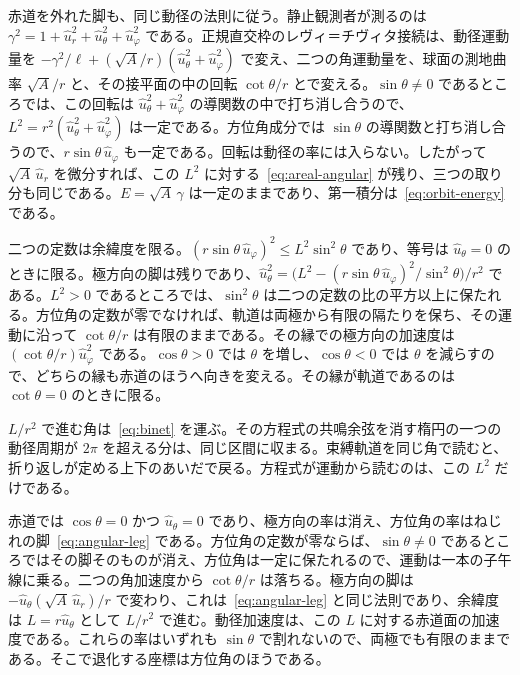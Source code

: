 \documentclass[a4paper]{article}
\begin{document}
赤道を外れた脚も、同じ動径の法則に従う。静止観測者が測るのは \(\gamma^{2}=1+\hat{u}_{r}^{2}+\hat{u}_{\theta}^{2}+\hat{u}_{\varphi}^{2}\) である。正規直交枠のレヴィ＝チヴィタ接続は、動径運動量を \(-\gamma^{2}/\ell+(\sqrt{A}/r)(\hat{u}_{\theta}^{2}+\hat{u}_{\varphi}^{2})\) で変え、二つの角運動量を、球面の測地曲率 \(\sqrt{A}/r\) と、その接平面の中の回転 \(\cot\theta/r\) とで変える。\(\sin\theta\neq 0\) であるところでは、この回転は \(\hat{u}_{\theta}^{2}+\hat{u}_{\varphi}^{2}\) の導関数の中で打ち消し合うので、\(L^{2}=r^{2}(\hat{u}_{\theta}^{2}+\hat{u}_{\varphi}^{2})\) は一定である。方位角成分では \(\sin\theta\) の導関数と打ち消し合うので、\(r\sin\theta\,\hat{u}_{\varphi}\) も一定である。回転は動径の率には入らない。したがって \(\sqrt{A}\,\hat{u}_{r}\) を微分すれば、この \(L^{2}\) に対する~\eqref{eq:areal-angular} が残り、三つの取り分も同じである。\(E=\sqrt{A}\,\gamma\) は一定のままであり、第一積分は~\eqref{eq:orbit-energy} である。

二つの定数は余緯度を限る。\((r\sin\theta\,\hat{u}_{\varphi})^{2}\le L^{2}\sin^{2}\theta\) であり、等号は \(\hat{u}_{\theta}=0\) のときに限る。極方向の脚は残りであり、\(\hat{u}_{\theta}^{2}=\bigl(L^{2}-(r\sin\theta\,\hat{u}_{\varphi})^{2}/\sin^{2}\theta\bigr)/r^{2}\) である。\(L^{2}>0\) であるところでは、\(\sin^{2}\theta\) は二つの定数の比の平方以上に保たれる。方位角の定数が零でなければ、軌道は両極から有限の隔たりを保ち、その運動に沿って \(\cot\theta/r\) は有限のままである。その縁での極方向の加速度は \((\cot\theta/r)\hat{u}_{\varphi}^{2}\) である。\(\cos\theta>0\) では \(\theta\) を増し、\(\cos\theta<0\) では \(\theta\) を減らすので、どちらの縁も赤道のほうへ向きを変える。その縁が軌道であるのは \(\cot\theta=0\) のときに限る。

\(L/r^{2}\) で進む角は~\eqref{eq:binet} を運ぶ。その方程式の共鳴余弦を消す楕円の一つの動径周期が \(2\pi\) を超える分は、同じ区間に収まる。束縛軌道を同じ角で読むと、折り返しが定める上下のあいだで戻る。方程式が運動から読むのは、この \(L^{2}\) だけである。

赤道では \(\cos\theta=0\) かつ \(\hat{u}_{\theta}=0\) であり、極方向の率は消え、方位角の率はねじれの脚~\eqref{eq:angular-leg} である。方位角の定数が零ならば、\(\sin\theta\neq 0\) であるところではその脚そのものが消え、方位角は一定に保たれるので、運動は一本の子午線に乗る。二つの角加速度から \(\cot\theta/r\) は落ちる。極方向の脚は \(-\hat{u}_{\theta}(\sqrt{A}\,\hat{u}_{r})/r\) で変わり、これは~\eqref{eq:angular-leg} と同じ法則であり、余緯度は \(L=r\hat{u}_{\theta}\) として \(L/r^{2}\) で進む。動径加速度は、この \(L\) に対する赤道面の加速度である。これらの率はいずれも \(\sin\theta\) で割れないので、両極でも有限のままである。そこで退化する座標は方位角のほうである。
\end{document}

